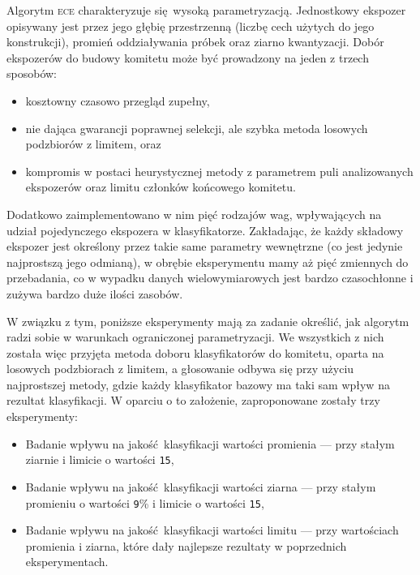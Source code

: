 
Algorytm \textsc{ece} charakteryzuje się wysoką parametryzacją. Jednostkowy ekspozer opisywany jest przez jego głębię przestrzenną (liczbę cech użytych do jego konstrukcji), promień oddziaływania próbek oraz ziarno kwantyzacji. Dobór ekspozerów do budowy komitetu może być prowadzony na jeden z trzech sposobów:
	\begin{itemize}
		\item kosztowny czasowo przegląd zupełny, 
		\item nie dająca gwarancji poprawnej selekcji, ale szybka metoda losowych podzbiorów z limitem, oraz
		\item kompromis w postaci heurystycznej metody z parametrem puli analizowanych ekspozerów oraz limitu członków końcowego komitetu.
	\end{itemize}
	
Dodatkowo zaimplementowano w nim pięć rodzajów wag, wpływających na udział pojedynczego ekspozera w klasyfikatorze. Zakładając, że każdy składowy ekspozer jest określony przez takie same parametry wewnętrzne (co jest jedynie najprostszą jego odmianą), w obrębie eksperymentu mamy aż pięć zmiennych do przebadania, co w wypadku danych wielowymiarowych jest bardzo czasochłonne i zużywa bardzo duże ilości zasobów.

W związku z tym, poniższe eksperymenty mają za zadanie określić, jak algorytm radzi sobie w warunkach ograniczonej parametryzacji. We wszystkich z nich została więc przyjęta metoda doboru klasyfikatorów do komitetu, oparta na losowych podzbiorach z limitem, a głosowanie odbywa się przy użyciu najprostszej metody, gdzie każdy klasyfikator bazowy ma taki sam wpływ na rezultat klasyfikacji. W oparciu o to założenie, zaproponowane zostały trzy eksperymenty:

\begin{itemize}
	\item Badanie wpływu na jakość klasyfikacji wartości promienia --- przy stałym ziarnie i limicie o wartości \verb|15|,
	\item Badanie wpływu na jakość klasyfikacji wartości ziarna --- przy stałym promieniu o wartości \verb|9|\% i limicie o wartości \verb|15|,
	\item Badanie wpływu na jakość klasyfikacji wartości limitu --- przy wartościach promienia i ziarna, które dały najlepsze rezultaty w poprzednich eksperymentach. 
\end{itemize}
